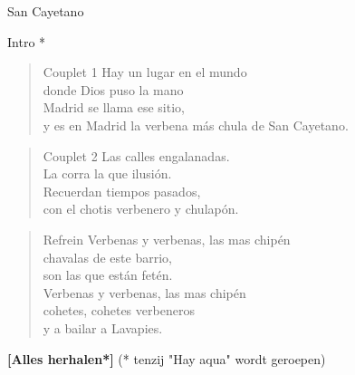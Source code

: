 \begin{song}{San Cayetano}
\begin{instrumental}{Intro}
   \measure{}
  * \measure{}%
   \hspace{3em} \measure{}
   
\end{instrumental}

\begin{verse}{Couplet 1}
Hay un lugar en el mundo\\
donde Dios puso la mano\\
\chord{}Madrid se llama ese sitio,\\
y es en Madrid la verbena m\'{a}s chula de San Cayetano.\\
\end{verse}

\begin{verse}{Couplet 2}
Las calles engalanadas.\\
La corra la que ilusi\'{o}n.\\
Recuerdan tiempos pasados,\\
con el chotis verbenero y chulap\'{o}n.\hspace{1.75em}\\
\end{verse}

\begin{verse}{Refrein}
Verbenas y verbenas, las mas chip\'{e}n\\
\chord{}chavalas de este barrio,\\
son las que est\'{a}n fet\'{e}n.\\
Verbenas y verbenas, las mas chip\'{e}n\\
cohetes, cohetes verbeneros\\
y a bailar a Lavapies.\hspace{1.75em}\\
\end{verse}

\textbf{[Alles herhalen*]}\hspace{10em} (* tenzij "Hay aqua" wordt geroepen)
\end{song}
